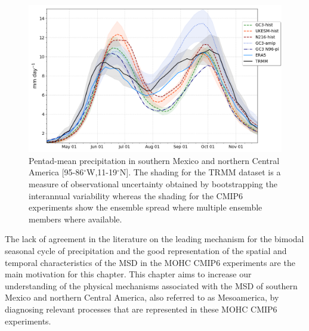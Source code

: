  \begin{figure}[t!]
\includegraphics[width=\linewidth]{figures/seasonal_cycle_p3.png}
\caption[Seasonal cycle of precipitation in Mesoamerica]{Pentad-mean precipitation in southern Mexico and northern Central America [95-86$^\circ$W,11-19$^\circ$N]. The shading for the TRMM dataset is a measure of observational uncertainty obtained by bootstrapping the interannual variability whereas the shading for the CMIP6 experiments show the ensemble spread where multiple ensemble members where available. }
\label{fig:msdcaribb}
\end{figure} 
 
The lack of agreement in the literature on the leading mechanism for the bimodal seasonal cycle of precipitation and the good representation of the spatial and temporal characteristics of the MSD in the MOHC CMIP6 experiments are the main motivation for this chapter.
This chapter aims to increase our understanding of the physical mechanisms associated with the MSD of southern Mexico and northern Central America, also referred to as Mesoamerica, by diagnosing relevant processes that are represented in these MOHC CMIP6 experiments. 


